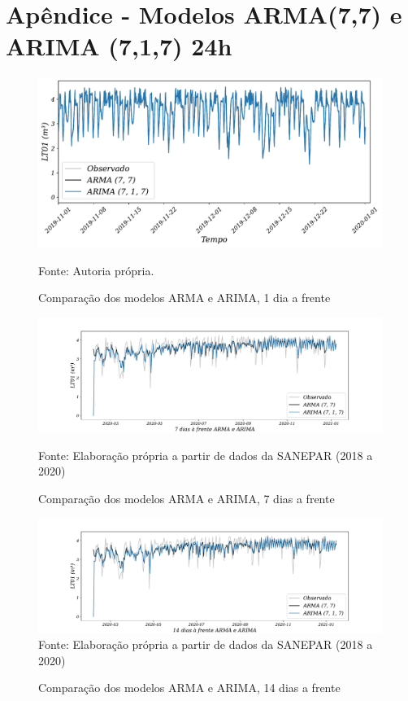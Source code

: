 
\section{Ap\^endice - Modelos ARMA(7,7) e ARIMA (7,1,7) 24h}\label{sec:armaarima24}

\begin{figure}[H]
	\centering
	\caption{Comparação dos modelos ARMA e ARIMA, 1 dia a frente }
	\label{fig:1-ARMA-ARIMA24}
	\includegraphics[width=1\linewidth]{Apendices/Figuras/modelagem-24h/1-ARMA-ARIMA}
	
	Fonte: Autoria própria.
\end{figure}

\begin{figure}[H]
	\centering
	\caption{Comparação dos modelos ARMA e ARIMA, 7 dias a frente }
	\label{fig:10-ARMA-ARIMA24}
	\includegraphics[width=1\linewidth]{Apendices/Figuras/modelagem-24h/7-ARMA-ARIMA}
	
Fonte: Elaboração própria a partir de dados da SANEPAR (2018 a 2020)
\end{figure}


\begin{figure}[H]
	\centering
	\caption{Comparação dos modelos ARMA e ARIMA, 14 dias a frente }
	\label{fig:30-ARMA-ARIMA24}
	\includegraphics[width=1\linewidth]{Apendices/Figuras/modelagem-24h/14-ARMA-ARIMA}
Fonte: Elaboração própria a partir de dados da SANEPAR (2018 a 2020)
\end{figure}

